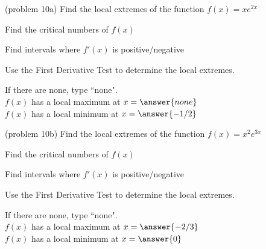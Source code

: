 \documentclass[handout]{ximera}
\begin{document}
\begin{example}[example 10]
\begin{image}
\end{image}
\end{example}

\begin{problem}(problem 10a)
Find the local extremes of the function $f(x) = xe^{2x}$\\
\begin{hint}
Find the critical numbers of $f(x)$
\end{hint}
\begin{hint}
Find intervals where $f'(x)$ is positive/negative
\end{hint}
\begin{hint}
Use the First Derivative Test to determine the local extremes.
\end{hint}

If there are none, type ``none".\\
$f(x)$ has a local maximum at $x = \answer{none}$\\
$f(x)$ has a local minimum at $x = \answer{-1/2}$
\end{problem}


\begin{problem}(problem 10b)
Find the local extremes of the function $f(x) = x^2e^{3x}$\\
\begin{hint}
Find the critical numbers of $f(x)$
\end{hint}
\begin{hint}
Find intervals where $f'(x)$ is positive/negative
\end{hint}
\begin{hint}
Use the First Derivative Test to determine the local extremes.
\end{hint}

If there are none, type ``none".\\
$f(x)$ has a local maximum at $x = \answer{-2/3}$\\
$f(x)$ has a local minimum at $x = \answer{0}$
\end{problem}
\end{document}
